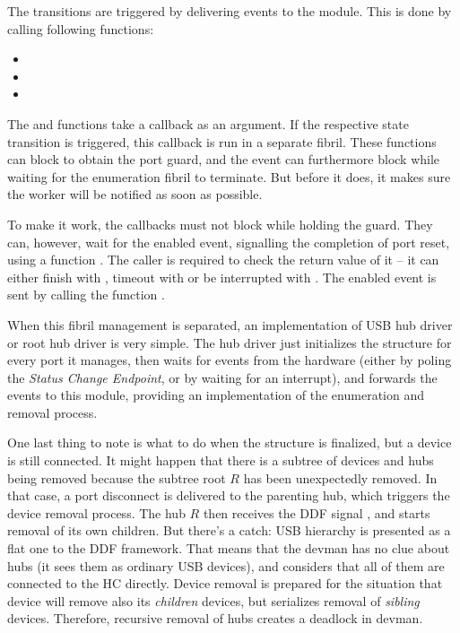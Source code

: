 The transitions are triggered by delivering events to the module. This is done
by calling following functions:

\begin{itemize}
	\item {}
	\item {}
	\item {}
\end{itemize}

The  and  functions take a callback as an
argument. If the respective state transition is triggered, this callback is run
in a separate fibril. These functions can block to obtain the port guard, and
the  event can furthermore block while waiting for the
enumeration fibril to terminate. But before it does, it makes sure the worker
will be notified as soon as possible.

To make it work, the callbacks must not block while holding the guard. They
can, however, wait for the enabled event, signalling the completion of port
reset, using a function . The caller is required
to check the return value of it -- it can either finish with ,
timeout with  or be interrupted with . The enabled
event is sent by calling the function .

When this fibril management is separated, an implementation of USB hub driver or
root hub driver is very simple. The hub driver just initializes the
 structure for every port it manages, then waits for events
from the hardware (either by poling the \textit{Status Change Endpoint}, or by
waiting for an interrupt), and forwards the events to this module, providing an
implementation of the enumeration and removal process.

One last thing to note is what to do when the structure is finalized, but
a device is still connected. It might happen that there is a subtree of devices
and hubs being removed because the subtree root $R$ has been unexpectedly
removed. In that case, a port disconnect is delivered to the parenting hub,
which triggers the device removal process. The hub $R$ then receives the DDF
signal , and starts removal of its own children. But
there's a catch: USB hierarchy is presented as a flat one to the DDF framework.
That means that the devman has no clue about hubs (it sees them as ordinary USB
devices), and considers that all of them are connected to the HC directly.
Device removal is prepared for the situation that device will remove also its
\textit{children} devices, but serializes removal of \textit{sibling} devices.
Therefore, recursive removal of hubs creates a deadlock in devman.

